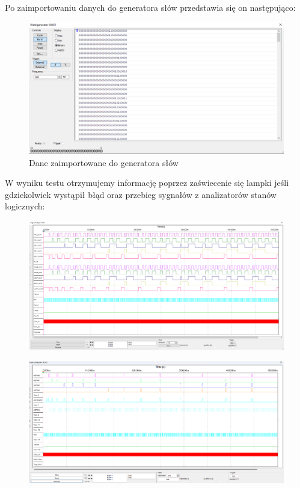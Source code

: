 \documentclass[a4paper]{article}
\begin{document}
Po zaimportowaniu danych do generatora słów przedstawia się on następująco:
\begin{figure}[H]
    \centering
    \includegraphics[width=\textwidth]{general_test_word_generator.png}
    \caption{Dane zaimportowane do generatora słów}
\end{figure}

\pagebreak
W wyniku testu otrzymujemy informację poprzez zaświecenie się lampki jeśli gdziekolwiek wystąpił błąd oraz 
przebieg sygnałów z analizatorów stanów logicznych:
\begin{figure}[H]
    \centering
    \includegraphics[width=\textwidth]{general_test_logic_analyzer.png}
\end{figure}

\begin{figure}[H]
    \centering
    \includegraphics[width=\textwidth]{general_test_logic_analyzer_xla2.png}
\end{figure}
\pagebreak
\end{document}
